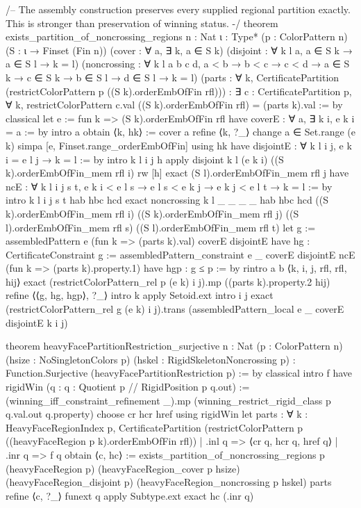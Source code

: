 \documentclass[11pt,reqno]{amsart}
\theoremstyle{definition}
\begin{document}
\begin{LeanCode}
/-- The assembly construction preserves every supplied regional partition
exactly. This is stronger than preservation of winning status. -/
theorem exists_partition_of_noncrossing_regions {n : Nat} {ι : Type*}
    (p : ColorPattern n) (S : ι → Finset (Fin n))
    (cover : ∀ a, ∃ k, a ∈ S k)
    (disjoint : ∀ k l a, a ∈ S k → a ∈ S l → k = l)
    (noncrossing : ∀ k l a b c d, a < b → b < c → c < d →
      a ∈ S k → c ∈ S k → b ∈ S l → d ∈ S l → k = l)
    (parts : ∀ k, CertificatePartition
      (restrictColorPattern p ((S k).orderEmbOfFin rfl))) :
    ∃ c : CertificatePartition p, ∀ k,
      restrictColorPattern c.val ((S k).orderEmbOfFin rfl) = (parts k).val := by
  classical
  let e := fun k => (S k).orderEmbOfFin rfl
  have coverE : ∀ a, ∃ k i, e k i = a := by
    intro a
    obtain ⟨k, hk⟩ := cover a
    refine ⟨k, ?_⟩
    change a ∈ Set.range (e k)
    simpa [e, Finset.range_orderEmbOfFin] using hk
  have disjointE : ∀ k l i j, e k i = e l j → k = l := by
    intro k l i j h
    apply disjoint k l (e k i) ((S k).orderEmbOfFin_mem rfl i)
    rw [h]
    exact (S l).orderEmbOfFin_mem rfl j
  have ncE : ∀ k l i j s t, e k i < e l s → e l s < e k j → e k j < e l t → k = l := by
    intro k l i j s t hab hbc hcd
    exact noncrossing k l _ _ _ _ hab hbc hcd
      ((S k).orderEmbOfFin_mem rfl i) ((S k).orderEmbOfFin_mem rfl j)
      ((S l).orderEmbOfFin_mem rfl s) ((S l).orderEmbOfFin_mem rfl t)
  let g := assembledPattern e (fun k => (parts k).val) coverE disjointE
  have hg : CertificateConstraint g := assembledPattern_constraint e _ coverE disjointE ncE
    (fun k => (parts k).property.1)
  have hgp : g ≤ p := by
    rintro a b ⟨k, i, j, rfl, rfl, hij⟩
    exact (restrictColorPattern_rel p (e k) i j).mp ((parts k).property.2 hij)
  refine ⟨⟨g, hg, hgp⟩, ?_⟩
  intro k
  apply Setoid.ext
  intro i j
  exact (restrictColorPattern_rel g (e k) i j).trans
    (assembledPattern_local e _ coverE disjointE k i j)

theorem heavyFacePartitionRestriction_surjective {n : Nat} (p : ColorPattern n)
    (hsize : NoSingletonColors p) (hskel : RigidSkeletonNoncrossing p) :
    Function.Surjective (heavyFacePartitionRestriction p) := by
  classical
  intro f
  have rigidWin (q : {q : Quotient p // RigidPosition p q.out}) :=
    (winning_iff_constraint_refinement _).mp
      (winning_restrict_rigid_class p q.val.out q.property)
  choose cr hcr href using rigidWin
  let parts : ∀ k : HeavyFaceRegionIndex p, CertificatePartition
      (restrictColorPattern p ((heavyFaceRegion p k).orderEmbOfFin rfl))
    | .inl q => ⟨cr q, hcr q, href q⟩
    | .inr q => f q
  obtain ⟨c, hc⟩ := exists_partition_of_noncrossing_regions p (heavyFaceRegion p)
    (heavyFaceRegion_cover p hsize) (heavyFaceRegion_disjoint p)
    (heavyFaceRegion_noncrossing p hskel) parts
  refine ⟨c, ?_⟩
  funext q
  apply Subtype.ext
  exact hc (.inr q)


\end{LeanCode}
\end{document}
